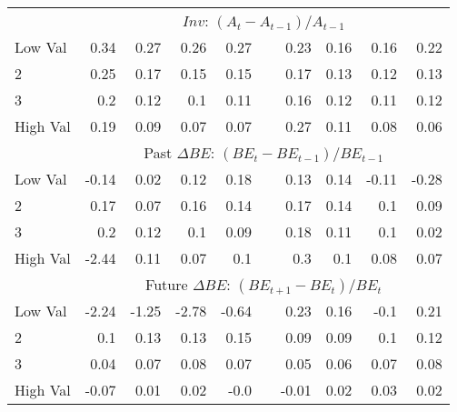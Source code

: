 \begin{tabular}{lrrrrlrrrr}
    & \multicolumn{9}{c}{$Inv$: $(A_t - A_{t-1}) / A_{t-1}$} \\
    Low Val    & 0.34  & 0.27  & 0.26  & 0.27  & & 0.23  & 0.16  & 0.16  & 0.22  \\
           2   & 0.25  & 0.17  & 0.15  & 0.15  & & 0.17  & 0.13  & 0.12  & 0.13  \\
           3   & 0.2  & 0.12  & 0.1  & 0.11  & & 0.16  & 0.12  & 0.11  & 0.12  \\
    High Val   & 0.19  & 0.09  & 0.07  & 0.07  & & 0.27  & 0.11  & 0.08  & 0.06  \\
    [1em]
  

    & \multicolumn{9}{c}{Past $\Delta BE$: $(BE_t - BE_{t-1}) / BE_{t-1}$} \\
    Low Val    & -0.14  & 0.02  & 0.12  & 0.18  & & 0.13  & 0.14  & -0.11  & -0.28  \\
           2   & 0.17  & 0.07  & 0.16  & 0.14  & & 0.17  & 0.14  & 0.1  & 0.09  \\
           3   & 0.2  & 0.12  & 0.1  & 0.09  & & 0.18  & 0.11  & 0.1  & 0.02  \\
    High Val   & -2.44  & 0.11  & 0.07  & 0.1  & & 0.3  & 0.1  & 0.08  & 0.07  \\
    [1em]
  

    & \multicolumn{9}{c}{Future $\Delta BE$: $(BE_{t+1} - BE_t) / BE_t$} \\
    Low Val    & -2.24  & -1.25  & -2.78  & -0.64  & & 0.23  & 0.16  & -0.1  & 0.21  \\
           2   & 0.1  & 0.13  & 0.13  & 0.15  & & 0.09  & 0.09  & 0.1  & 0.12  \\
           3   & 0.04  & 0.07  & 0.08  & 0.07  & & 0.05  & 0.06  & 0.07  & 0.08  \\
    High Val   & -0.07  & 0.01  & 0.02  & -0.0  & & -0.01  & 0.02  & 0.03  & 0.02  \\
    [1em]
  

  \bottomrule
\end{tabular}